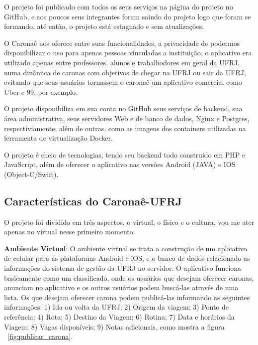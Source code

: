 O projeto foi publicado com todos os seus serviços na página do projeto no GitHub, e aos poucos seus integrantes foram saindo do projeto logo que foram se formando, até então, o projeto está estagnado e sem atualizações.

O Caronaê nos oferece entre suas funcionalidades, a privacidade de podermos disponibilizar o uso para apenas pessoas vínculadas a instituição, o aplicativo era utilizado apenas entre professores, alunos e trabalhodores em geral da UFRJ, numa dinâmica de caronas com objetivos de chegar na UFRJ ou sair da UFRJ, evitando que seus usuários tornassem o caronaê um aplicativo comercial como Uber e 99, por exemplo.

O projeto disponibiliza em sua conta no GitHub seus serviços de backend, sua área administrativa, seus servidores Web e de banco de dados, Nginx e Postgres, respectiviamente, além de outras, como as imagens dos containers utilizadas na ferramenta de virtualização Docker.

O projeto é cheio de tecnologias, tendo seu backend todo construído em PHP e JavaScript, além de oferecer o aplicativo nas versões Android (JAVA) e IOS (Object-C/Swift).

\subsection{Características do Caronaê-UFRJ}

O projeto foi dividido em três aspectos, o virtual, o físico e o cultura, vou me ater apenas no virtual nesse primeiro momento:

\textbf{Ambiente Virtual}: O ambiente virtual se trata a construção de um aplicativo de celular para as plataformas Android e iOS, e o banco de dados relacionado as informações do sistema de gestão da UFRJ no servidor. O aplicativo funciona basicamente como um classificado, onde os usuários que desejam oferecer caronas, anunciam no aplicativo e os outros usuários podem buscá-las através de uma lista. Os que desejam oferecer carona podem publicá-las informando as seguintes informações: 1) Ida ou volta da UFRJ; 2) Origem da viagem; 3) Ponto de referência; 4) Rota; 5) Destino da Viagem; 6) Rotina; 7) Data e horários da Viagem; 8) Vagas disponíveis; 9) Notas adicionais, como mostra a figura ~\ref{fig:publicar_carona}.

